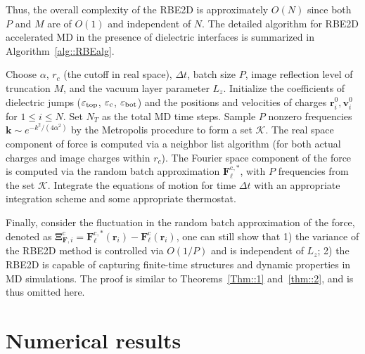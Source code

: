 Thus, the overall complexity of the RBE2D is approximately $O(N)$ since both $P$ and $M$ are of $O(1)$ and independent   {of} $N$.
The detailed algorithm for RBE2D accelerated MD in the presence of dielectric interfaces is summarized in Algorithm~\ref{alg::RBEalg}.

\begin{algorithm}[H]
 \caption{(RBE2D for quasi-2D systems under dielectric confinement)}\label{alg::RBEalg}
 \begin{algorithmic}[1]
  \State Choose $\alpha$, $r_c$ (the cutoff in real space), $\Delta t$, batch size $P$, image reflection level of truncation $M$, and the vacuum layer parameter $L_z$. Initialize the coefficients of dielectric jumps ($\varepsilon_{\rm{top}}$, $\varepsilon_{\rm{c}}$, $\varepsilon_{\rm{bot}}$) and the positions and velocities of charges $\bm{r}^0_i, \bm{v}^0_i$ for $1\le i\le N$. Set $N_T$ as the total MD time steps.
  \State Sample $P$ nonzero frequencies $\bm{k}\sim e^{-k^2/(4\alpha^2)}$ by the Metropolis procedure to form a set $\mathcal{K}$.
  \State The real space component of force is computed via a neighbor list algorithm (for both actual charges and image charges within $r_c$).
  \State The Fourier space component of  {the} force is computed via the random batch approximation $\bm{F}_{\ell}^{\text{c},*}$, with $P$ frequencies from the set $\mathcal{K}$.
  \State Integrate the equations of motion for time $\Delta t$ with  {an} appropriate integration scheme and some appropriate thermostat. 
  \EndFor
 \end{algorithmic}
\end{algorithm}

Finally, consider the fluctuation in the random batch approximation of the force, denoted as $\bm{\Xi}_{\bm{F},i}^{\text{c}}=\bm{F}_{\ell}^{\text{c},*}(\bm{r}_i)-\bm{F}_{\ell}^{\text{c}}(\bm{r}_i)$, one can still show that 1) the variance of the RBE2D method is controlled via $O(1/P)$ and is independent of $L_z$; 2) the RBE2D is capable of capturing finite-time structures and dynamic properties in MD simulations. 
The proof is similar to Theorems~\ref{Thm::1} and~\ref{thm::2}, and is thus omitted here.

\section{Numerical results}\label{sec::numerical}

